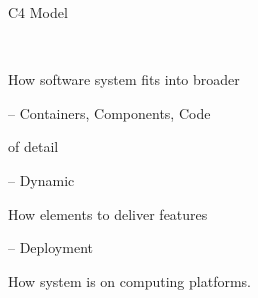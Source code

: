 \documentclass{slide}
\begin{document}
\begin{frame}{C4 Model}

\Large{
\begin{description}
    \item<1->[Context] ~~~~
    \begin{itemize}
        \large{\item[$\bullet$] How software system fits into broader }
    \end{itemize}
    \item<2->[Structure] -- Containers, Components, Code
    \begin{itemize}
        \large{\item[$\bullet$]  of detail}
    \end{itemize}
    \item<3->[Behaviour] -- Dynamic
    \begin{itemize}
        \large{\item[$\bullet$] How elements  to deliver features}
    \end{itemize}
    \item<4->[Infrastructure] -- Deployment
    \begin{itemize}
        \large{\item[$\bullet$] How system is  on computing platforms.}
    \end{itemize}
\end{description}
}

\end{frame}
\end{document}
